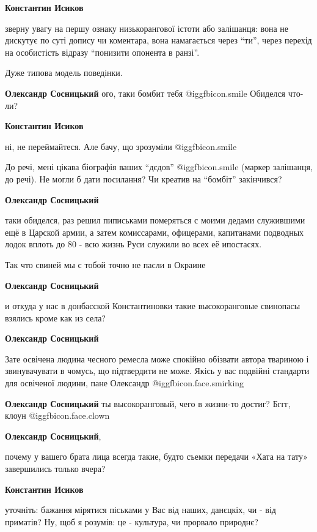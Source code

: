 \begin{itemize}
\begin{itemize}
\textbf{Константин Исиков} 

зверну увагу на першу ознаку низькорангової істоти або залішанця: вона не
дискутує по суті допису чи коментара, вона намагається через \enquote{ти}, через
перехід на особистість відразу \enquote{понизити опонента в ранзі}.

Дуже типова модель поведінки.

\textbf{Олександр Сосницький} ого, таки бомбит тебя  @igg{fbicon.smile} 
Обиделся что-ли?

\textbf{Константин Исиков} 

ні, не переймайтеся. Але бачу, що зрозуміли  @igg{fbicon.smile} 

До речі, мені цікава біографія ваших \enquote{дєдов}  @igg{fbicon.smile}  (маркер залішанця, до речі). Не
могли б дати посилання? Чи креатив на \enquote{бомбіт} закінчився?

\textbf{Олександр Сосницький} 

таки обиделся, раз решил пиписьками померяться с моими дедами служившими ещё в
Царской армии, а затем комиссарами, офицерами, капитанами подводных лодок
вплоть до 80 - всю жизнь Руси служили во всех её ипостасях.

Так что свиней мы с тобой точно не пасли в Окраине

\textbf{Олександр Сосницький} 

и откуда у нас в донбасской Константиновки такие высокоранговые свинопасы
взялись кроме как из села?

\textbf{Олександр Сосницький}

Зате освічена людина чесного ремесла може спокійно обізвати автора твариною і
звинувачувати в чомусь, що підтвердити не може. Якісь у вас подвійні стандарти
для освіченої людини, пане Олександр  @igg{fbicon.face.smirking} 

\textbf{Олександр Сосницький} ты высокоранговый, чего в жизни-то достиг?
Бггг, клоун  @igg{fbicon.face.clown} 

\textbf{Олександр Сосницький}, 

почему у вашего брата лица всегда такие, будто съемки передачи «Хата на тату»
завершились только вчера?

\textbf{Константин Исиков} 

уточніть: бажання мірятися піськами у Вас від наших, данєцкіх, чи - від
приматів? Ну, щоб я розумів: це - культура, чи прорвало природнє?


\end{itemize}
\end{itemize}
